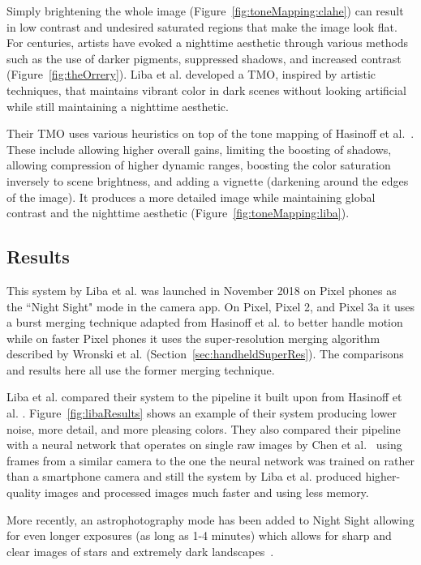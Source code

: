 \documentclass{sig-alternate}
\begin{document}
Simply brightening the whole image (Figure~\ref{fig:toneMapping:clahe}) can result in low contrast and undesired saturated regions that make the image look flat. For centuries, artists have evoked a nighttime aesthetic through various methods such as the use of darker pigments, suppressed shadows, and increased contrast (Figure~\ref{fig:theOrrery}).
Liba et al. developed a TMO, inspired by artistic techniques, that maintains vibrant color in dark scenes without looking artificial while still maintaining a nighttime aesthetic.

Their TMO uses various heuristics on top of the tone mapping of Hasinoff et al.~\cite{Hasinoff2016}. These include allowing higher overall gains, limiting the boosting of shadows, allowing compression of higher dynamic ranges, boosting the color saturation inversely to scene brightness, and adding a vignette (darkening around the edges of the image).
It produces a more detailed image while maintaining global contrast and the nighttime aesthetic (Figure~\ref{fig:toneMapping:liba}).

\subsection{Results}



This system by Liba et al. was launched in November 2018 on Pixel phones as the ``Night Sight" mode in the camera app. On Pixel, Pixel 2, and Pixel 3a it uses a burst merging technique adapted from Hasinoff et al. \cite{Hasinoff2016} to better handle motion while on faster Pixel phones it uses the super-resolution merging algorithm described by Wronski et al. \cite{Wronski2019} (Section~\ref{sec:handheldSuperRes}). The comparisons and results here all use the former merging technique.

\pagebreak

Liba et al. compared their system to the pipeline it built upon from Hasinoff et al. \cite{Hasinoff2016}. Figure~\ref{fig:libaResults} shows an example of their system producing lower noise, more detail, and more pleasing colors. They also compared their pipeline with a neural network that operates on single raw images by Chen et al.~\cite{Chen2018} using frames from a similar camera to the one the neural network was trained on rather than a smartphone camera and still the system by Liba et al. produced higher-quality images and processed images much faster and using less memory.

More recently, an astrophotography mode has been added to Night Sight allowing for even longer exposures (as long as 1-4 minutes) which allows for sharp and clear images of stars and extremely dark landscapes~\cite{blog:Kainz2019}.
\end{document}
